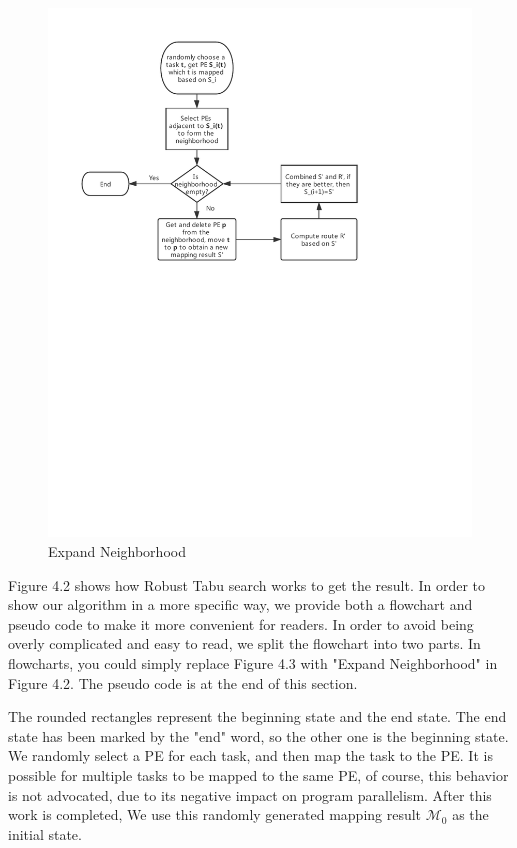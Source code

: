 \begin{figure}
    \centering
    \includegraphics{../Figures/Expand_Neighborhood.pdf}
    \caption{Expand Neighborhood}
\end{figure}

Figure 4.2 shows how Robust Tabu search works to get the result. In order to show our algorithm in a more specific way, we provide both a flowchart and pseudo code to make it more convenient for readers. In order to avoid being overly complicated and easy to read, we split the flowchart into two parts. In flowcharts, you could simply replace Figure 4.3 with "Expand Neighborhood" in Figure 4.2. The pseudo code is at the end of this section.

The rounded rectangles represent the beginning state and the end state. The end state has been marked by the "end" word, so the other one is the beginning state. We randomly select a PE for each task, and then map the task to the PE. It is possible for multiple tasks to be mapped to the same PE, of course, this behavior is not advocated, due to its negative impact on program parallelism. After this work is completed, We use this randomly generated mapping result $\mathcal{M}_0$ as the initial state. 


